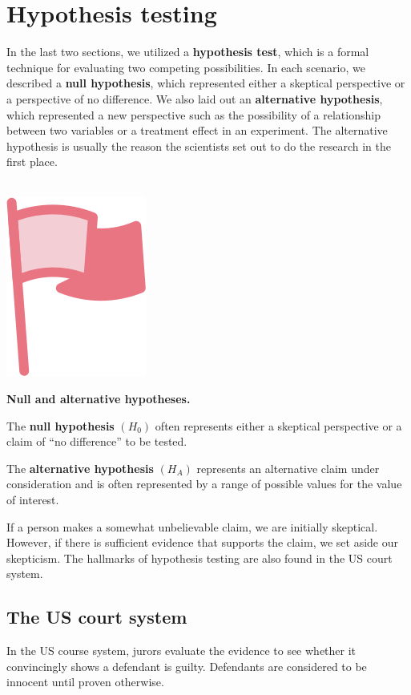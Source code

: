 \documentclass[
  10pt,
  openany]{book}
\newenvironment{mdframedwithfootImportant}
{   
    \savenotes
    \begin{mdframed}[%
    topline=true, bottomline=true, linecolor=oiR, linewidth=0.5pt,
    rightline=false, leftline=false,
    backgroundcolor=oiLGray]
    \renewcommand{\thempfootnote}{\arabic{footnote}}
    }
{
    \end{mdframed}
    \spewnotes
}
\newenvironment{important}{
    \let\oldtextbf\textbf
    \renewcommand{\textbf}[1]{{\textcolor{oiR}{\oldtextbf{##1}}}}
\vspace{4mm}
\begin{mdframedwithfootImportant}
\begin{minipage}[t]{0.10\textwidth}
{$\:$ \\ \setkeys{Gin}{width=2.5em,keepaspectratio}\includegraphics{images/_icons/important.png}}
\end{minipage}
\hfill
\begin{minipage}[t]{0.90\textwidth}
\vspace{-2mm}
\setlength{\parskip}{1em}
}{\end{minipage}
\end{mdframedwithfootImportant}
\vspace{4mm}
}
\begin{document}
\hypertarget{HypothesisTesting}{%
\section{Hypothesis testing}\label{HypothesisTesting}}

In the last two sections, we utilized a \textbf{hypothesis test}, which is a formal technique for evaluating two competing possibilities.
In each scenario, we described a \textbf{null hypothesis}, which represented either a skeptical perspective or a perspective of no difference.
We also laid out an \textbf{alternative hypothesis}, which represented a new perspective such as the possibility of a relationship between two variables or a treatment effect in an experiment.
The alternative hypothesis is usually the reason the scientists set out to do the research in the first place.

\begin{important}
\textbf{Null and alternative hypotheses.}

The \textbf{null hypothesis} \((H_0)\) often represents either a skeptical perspective or a claim of ``no difference'' to be tested.

The \textbf{alternative hypothesis} \((H_A)\) represents an alternative claim under consideration and is often represented by a range of possible values for the value of interest.

\end{important}

If a person makes a somewhat unbelievable claim, we are initially skeptical.
However, if there is sufficient evidence that supports the claim, we set aside our skepticism.
The hallmarks of hypothesis testing are also found in the US court system.

\hypertarget{the-us-court-system}{%
\subsection{The US court system}\label{the-us-court-system}}

In the US course system, jurors evaluate the evidence to see whether it convincingly shows a defendant is guilty.
Defendants are considered to be innocent until proven otherwise.
\end{document}
